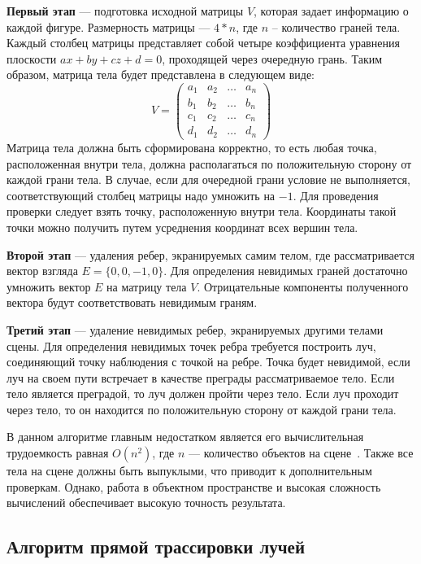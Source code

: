 \documentclass[a4paper, 14pt]{extreport}
\begin{document}
\textbf{Первый этап} --- подготовка исходной матрицы $V$, которая задает информацию о каждой фигуре. 
Размерность матрицы --- $4 * n$, где $n$ -- количество граней тела. Каждый столбец матрицы представляет собой четыре 
коэффициента уравнения плоскости $ax + by + cz + d = 0$, проходящей через очередную грань.
Таким образом, матрица тела будет представлена в следующем виде:
\begin{equation}
	V = \begin{pmatrix}
		a_{1} & a_{2} & \ldots & a_{n}\\
		b_{1} & b_{2} & \ldots & b_{n}\\
		c_{1} & c_{2} & \ldots & c_{n}\\
		d_{1} & d_{2} & \ldots & d_{n}
	\end{pmatrix}
\end{equation}
Матрица тела должна быть сформирована корректно, то есть любая точка, расположенная внутри тела, должна располагаться 
по положительную сторону от каждой грани тела. В случае, если для очередной грани условие не выполняется, 
соответствующий столбец матрицы надо умножить на $-1$.  Для проведения проверки следует взять точку, расположенную 
внутри тела. Координаты такой точки можно получить путем усреднения координат всех вершин тела.

\textbf{Второй этап} --- удаления ребер, экранируемых самим телом, где рассматривается вектор взгляда $E = \{0, 0, -1, 0\}$.
Для определения невидимых граней достаточно умножить вектор $E$ на матрицу тела $V$. Отрицательные компоненты 
полученного вектора будут соответствовать невидимым граням.

\textbf{Третий этап} --- удаление невидимых ребер, экранируемых другими телами сцены. 
Для определения невидимых точек ребра требуется построить луч, соединяющий точку наблюдения с точкой на ребре. 
Точка будет невидимой, если луч на своем пути встречает в качестве преграды рассматриваемое тело. 
Если тело является преградой, то луч должен пройти через тело.  Если луч проходит через тело, то он находится по 
положительную сторону от каждой грани тела.

В данном алгоритме главным недостатком является его вычислительная трудоемкость равная $O(n^2)$, где $n$ --- количество 
объектов на сцене~\cite{rodjers}. Также все тела на сцене должны быть выпуклыми, что приводит к дополнительным проверкам.
Однако, работа в объектном пространстве и высокая сложность вычислений обеспечивает высокую точность результата.

\subsection{Алгоритм прямой трассировки лучей}
\end{document}
